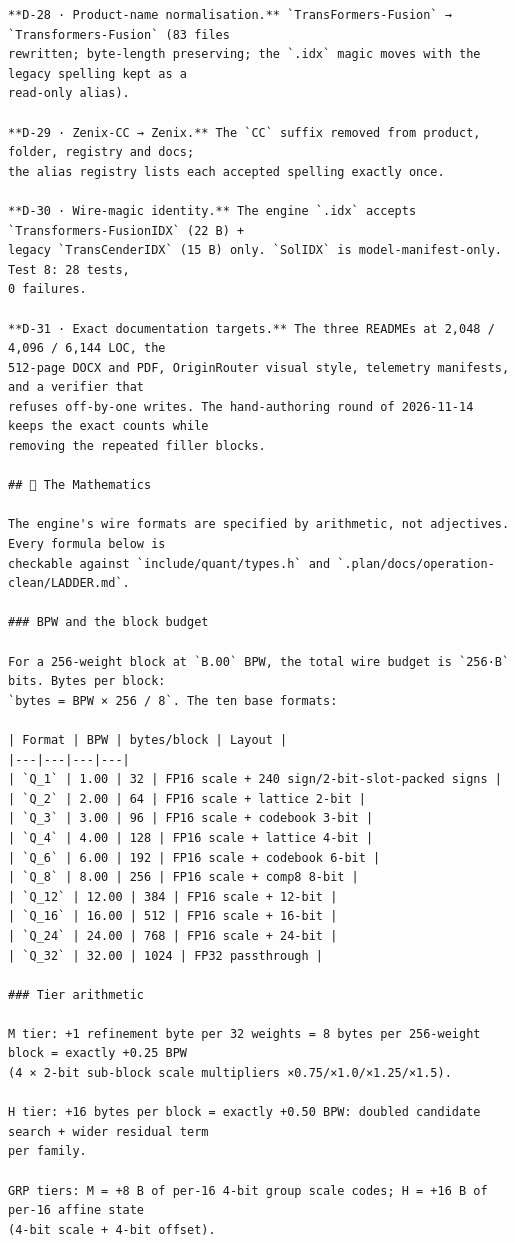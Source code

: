 \begin{Verbatim}[breaklines,breakanywhere,fontsize=\footnotesize]
**D-28 · Product-name normalisation.** `TransFormers-Fusion` → `Transformers-Fusion` (83 files
rewritten; byte-length preserving; the `.idx` magic moves with the legacy spelling kept as a
read-only alias).

**D-29 · Zenix-CC → Zenix.** The `CC` suffix removed from product, folder, registry and docs;
the alias registry lists each accepted spelling exactly once.

**D-30 · Wire-magic identity.** The engine `.idx` accepts `Transformers-FusionIDX` (22 B) +
legacy `TransCenderIDX` (15 B) only. `SolIDX` is model-manifest-only. Test 8: 28 tests,
0 failures.

**D-31 · Exact documentation targets.** The three READMEs at 2,048 / 4,096 / 6,144 LOC, the
512-page DOCX and PDF, OriginRouter visual style, telemetry manifests, and a verifier that
refuses off-by-one writes. The hand-authoring round of 2026-11-14 keeps the exact counts while
removing the repeated filler blocks.

## 🧮 The Mathematics

The engine's wire formats are specified by arithmetic, not adjectives. Every formula below is
checkable against `include/quant/types.h` and `.plan/docs/operation-clean/LADDER.md`.

### BPW and the block budget

For a 256-weight block at `B.00` BPW, the total wire budget is `256·B` bits. Bytes per block:
`bytes = BPW × 256 / 8`. The ten base formats:

| Format | BPW | bytes/block | Layout |
|---|---|---|---|
| `Q_1` | 1.00 | 32 | FP16 scale + 240 sign/2-bit-slot-packed signs |
| `Q_2` | 2.00 | 64 | FP16 scale + lattice 2-bit |
| `Q_3` | 3.00 | 96 | FP16 scale + codebook 3-bit |
| `Q_4` | 4.00 | 128 | FP16 scale + lattice 4-bit |
| `Q_6` | 6.00 | 192 | FP16 scale + codebook 6-bit |
| `Q_8` | 8.00 | 256 | FP16 scale + comp8 8-bit |
| `Q_12` | 12.00 | 384 | FP16 scale + 12-bit |
| `Q_16` | 16.00 | 512 | FP16 scale + 16-bit |
| `Q_24` | 24.00 | 768 | FP16 scale + 24-bit |
| `Q_32` | 32.00 | 1024 | FP32 passthrough |

### Tier arithmetic

M tier: +1 refinement byte per 32 weights = 8 bytes per 256-weight block = exactly +0.25 BPW
(4 × 2-bit sub-block scale multipliers ×0.75/×1.0/×1.25/×1.5).

H tier: +16 bytes per block = exactly +0.50 BPW: doubled candidate search + wider residual term
per family.

GRP tiers: M = +8 B of per-16 4-bit group scale codes; H = +16 B of per-16 affine state
(4-bit scale + 4-bit offset).


\end{Verbatim}
